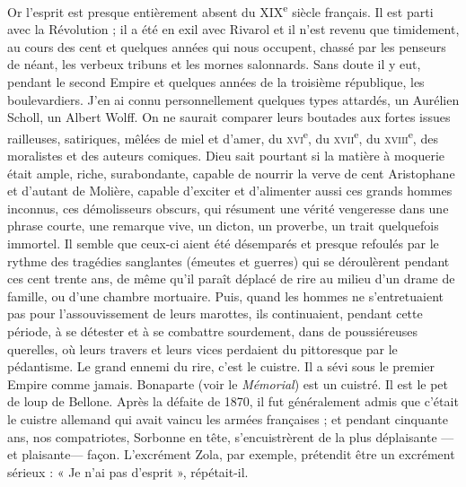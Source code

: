 \documentclass[french,twoside]{book} %
\begin{document}
Or l’esprit est presque entièrement absent du XIX\textsuperscript{e} siècle français. Il est parti avec la Révolution ; il a été en exil avec Rivarol et il n’est revenu que timidement, au cours des cent et quelques années qui nous occupent, chassé par les penseurs de néant, les verbeux tribuns et les mornes salonnards. Sans doute il y eut, pendant le second Empire et quelques années de la troisième république, les boulevardiers. J’en ai connu personnellement quelques types attardés, un Aurélien Scholl, un Albert Wolff. On ne saurait comparer leurs boutades aux fortes issues railleuses, satiriques, mêlées de miel et d’amer, du \textsc{xvi}\textsuperscript{e}, du \textsc{xvii}\textsuperscript{e}, du \textsc{xviii}\textsuperscript{e}, des moralistes et des auteurs comiques. Dieu sait pourtant si la matière à moquerie était ample, riche, surabondante, capable de nourrir la verve de cent Aristophane et d’autant de Molière, capable d’exciter et d’alimenter aussi ces grands hommes inconnus, ces démolisseurs obscurs, qui résument une vérité vengeresse dans une phrase courte, une remarque vive, un dicton, un proverbe, un trait quelquefois immortel. Il semble que ceux-ci aient été désemparés et presque refoulés par le rythme des tragédies sanglantes (émeutes et guerres) qui se déroulèrent pendant ces cent trente ans, de même qu’il paraît déplacé de rire au milieu d’un drame de famille, ou d’une chambre mortuaire. Puis, quand les hommes ne s’entretuaient pas pour l’assouvissement de leurs marottes, ils continuaient, pendant cette période, à se détester et à se combattre sourdement, dans de poussiéreuses querelles, où leurs travers et leurs vices perdaient du pittoresque par le pédantisme. Le grand ennemi du rire, c’est le cuistre. Il a sévi sous le premier Empire comme jamais. Bonaparte (voir le {\itshape Mémorial}) est un cuistré. Il est le pet de loup de Bellone. Après la défaite de 1870, il fut généralement admis que c’était le cuistre allemand qui avait vaincu les armées françaises ; et pendant cinquante ans, nos compatriotes, Sorbonne en tête, s’encuistrèrent de la plus déplaisante — et plaisante— façon. L’excrément Zola, par exemple, prétendit être un excrément sérieux : « Je n’ai pas d’esprit », répétait-il.\par
\end{document}
